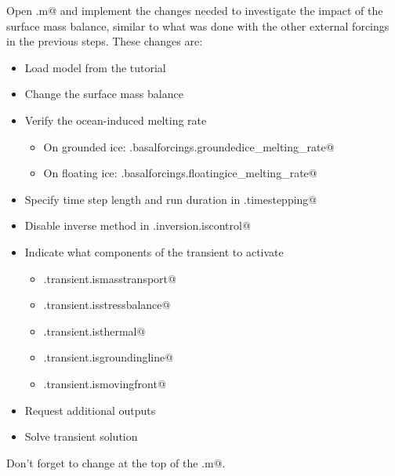 Open \verb@runme.m@ and implement the changes needed to investigate the impact of the surface mass balance, similar to what was done with the other external forcings in the previous steps. These changes are:
\begin{itemize}
	\item Load model from the \verb@Pig@ tutorial
	\item Change the surface mass balance
	\item Verify the ocean-induced melting rate
		\begin{itemize}
			\item On grounded ice: \verb@md.basalforcings.groundedice_melting_rate@
			\item On floating ice: \verb@md.basalforcings.floatingice_melting_rate@
		\end{itemize}
	\item Specify time step length and run duration in \verb@md.timestepping@
	\item Disable inverse method in \verb@md.inversion.iscontrol@
	\item Indicate what components of the transient to activate
		\begin{itemize}
			\item \verb@md.transient.ismasstransport@
			\item \verb@md.transient.isstressbalance@
			\item \verb@md.transient.isthermal@
			\item \verb@md.transient.isgroundingline@
			\item \verb@md.transient.ismovingfront@
		\end{itemize}
	\item Request additional outputs
	\item Solve transient solution
\end{itemize}

Don't forget to change \verb@step@ at the top of the \verb@runme.m@.

